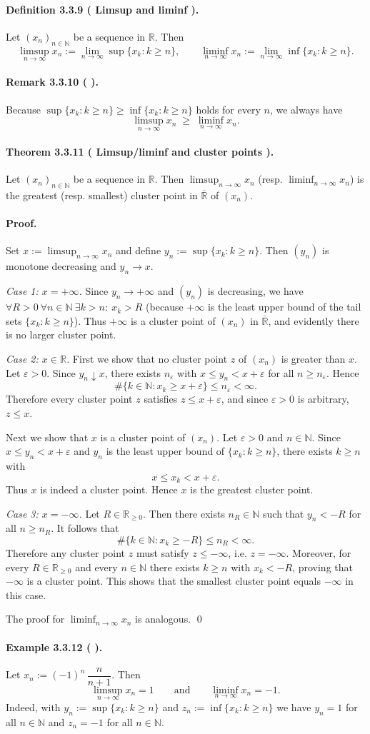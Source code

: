 \documentclass[12pt]{article}
\newcommand{\N}{\mathbb{N}}
\newcommand{\R}{\mathbb{R}}
\newcommand{\eps}{\varepsilon}
\newcommand{\NumberedDefinition}[3]{%
\paragraph*{Definition #1 ( #2 ).} #3\par}
\newcommand{\NumberedTheorem}[3]{%
\paragraph*{Theorem #1 ( #2 ).} #3\par}
\newcommand{\NumberedRemark}[3]{%
\paragraph*{Remark #1 ( #2 ).} #3\par}
\newcommand{\NumberedExample}[3]{%
\paragraph*{Example #1 ( #2 ).} #3\par}
\begin{document}
\NumberedDefinition{3.3.9}{Limsup and liminf}{Let $(x_n)_{n\in\N}$ be a sequence in $\R$. Then
\[
	\limsup_{n\to\infty} x_n := \lim_{n\to\infty} \sup\{x_k : k\ge n\},
	\qquad
	\liminf_{n\to\infty} x_n := \lim_{n\to\infty} \inf\{x_k : k\ge n\}.
\]}

\NumberedRemark{3.3.10}{}{Because $\sup\{x_k : k\ge n\} \ge \inf\{x_k : k\ge n\}$ holds for every $n$, we always have
\[
	\limsup_{n\to\infty} x_n \;\ge\; \liminf_{n\to\infty} x_n.
\]}

\NumberedTheorem{3.3.11}{Limsup/liminf and cluster points}{Let $(x_n)_{n\in\N}$ be a sequence in $\R$. Then $\limsup_{n\to\infty} x_n$ (resp. $\liminf_{n\to\infty} x_n$) is the greatest (resp. smallest) cluster point in $\overline{\R}$ of $(x_n)$.}

\paragraph{Proof.} Set $x := \limsup_{n\to\infty} x_n$ and define $y_n := \sup\{x_k : k\ge n\}$. Then $(y_n)$ is monotone decreasing and $y_n\to x$.

\emph{Case 1: $x=+\infty$.} Since $y_n\to +\infty$ and $(y_n)$ is decreasing, we have $\forall R>0\ \forall n\in\N\ \exists k>n:\ x_k>R$ (because $+\infty$ is the least upper bound of the tail sets $\{x_k:k\ge n\}$). Thus $+\infty$ is a cluster point of $(x_n)$ in $\overline{\R}$, and evidently there is no larger cluster point.

\emph{Case 2: $x\in\R$.} First we show that no cluster point $z$ of $(x_n)$ is greater than $x$. Let $\eps>0$. Since $y_n\downarrow x$, there exists $n_\eps$ with $x\le y_n < x+\eps$ for all $n\ge n_\eps$. Hence
\[
	\#\{k\in\N : x_k \ge x+\eps\} \le n_\eps < \infty.
\]
Therefore every cluster point $z$ satisfies $z\le x+\eps$, and since $\eps>0$ is arbitrary, $z\le x$.

Next we show that $x$ is a cluster point of $(x_n)$. Let $\eps>0$ and $n\in\N$. Since $x\le y_n < x+\eps$ and $y_n$ is the least upper bound of $\{x_k:k\ge n\}$, there exists $k\ge n$ with
\[
	x \le x_k < x+\eps.
\]
Thus $x$ is indeed a cluster point. Hence $x$ is the greatest cluster point.

\emph{Case 3: $x=-\infty$.} Let $R\in\R_{\ge0}$. Then there exists $n_R\in\N$ such that $y_n<-R$ for all $n\ge n_R$. It follows that
\[
	\#\{k\in\N : x_k \ge -R\} \le n_R < \infty.
\]
Therefore any cluster point $z$ must satisfy $z\le -\infty$, i.e. $z=-\infty$. Moreover, for every $R\in\R_{\ge0}$ and every $n\in\N$ there exists $k\ge n$ with $x_k<-R$, proving that $-\infty$ is a cluster point. This shows that the smallest cluster point equals $-\infty$ in this case.

The proof for $\liminf_{n\to\infty} x_n$ is analogous. \qed

\NumberedExample{3.3.12}{}{Let $x_n := (-1)^n\,\dfrac{n}{n+1}$. Then
\[
	\limsup_{n\to\infty} x_n = 1
	\qquad\text{and}\qquad
	\liminf_{n\to\infty} x_n = -1.
\]
Indeed, with $y_n := \sup\{x_k:k\ge n\}$ and $z_n := \inf\{x_k:k\ge n\}$ we have $y_n=1$ for all $n\in\N$ and $z_n=-1$ for all $n\in\N$.}
\end{document}
